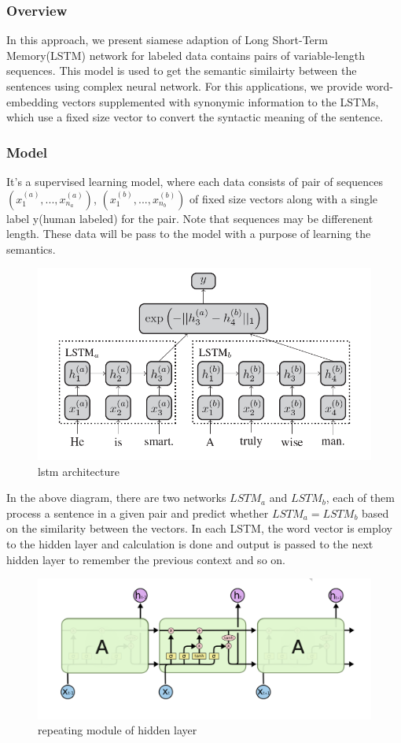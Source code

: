 
\subsubsection{Overview}
\par In this approach, we present  siamese adaption of Long Short-Term Memory(LSTM) network for labeled data contains pairs of variable-length sequences. This model is used to get the semantic similairty between the sentences using complex neural network. For this applications, we provide word-embedding vectors supplemented with synonymic information to the LSTMs, which use a fixed size vector to convert the syntactic meaning of the sentence. 

\subsubsection{Model}
\par It's a supervised learning model, where each data consists of pair of sequences 
$(x_1^{(a)},...,x_{n_a}^{(a)})$, $(x_1^{(b)},...,x_{n_b}^{(b)})$ of fixed size vectors along with a single label y(human labeled) for the pair. Note that sequences may be differenent length. These data will be pass to the model with a purpose of learning the semantics. 
 \begin{figure}[h]
    \centering
    \includegraphics[width=.75\textwidth]{lstm_image}
    \caption{lstm architecture}
\end{figure}
In the above diagram, there are two networks $LSTM_a$ and $LSTM_b$, each of them process a sentence in a given pair and predict whether  $LSTM_a=LSTM_b$ based on the similarity between the vectors. In each LSTM, the word vector is employ to the hidden layer and calculation is done and output is passed to the next hidden layer to remember the previous context and so on.
 \begin{figure}[h]
    \centering
    \includegraphics[width=.85\textwidth]{hidden_layer}
    \caption{repeating module of hidden layer}
\end{figure}
